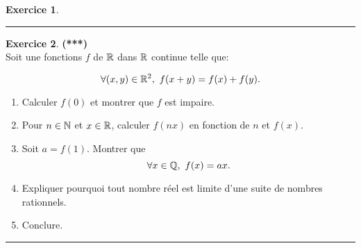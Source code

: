 \documentclass[a4paper,11pt]{article}
\theoremstyle{definition}
\newtheorem{exo}{Exercice} %
\begin{document}
\begin{minipage}{1\linewidth}
\begin{minipage}[t]{0.48\linewidth}
\begin{exo}
			\centering
			\rule{1\linewidth}{0.6pt}
		\end{exo}
	
		\begin{exo} \textbf{(***)}\quad\\[0.2cm]
			
			Soit une fonctions $f$ de $\mathbb{R}$ dans $\mathbb{R}$ continue telle que:
			
			
			$$\forall (x, y) \in \mathbb{R}^{2}, \ f(x+y) = f(x)+f(y).$$
			
			\begin{enumerate}
				\item Calculer $f (0)$ et montrer que $f$ est impaire.
				\item Pour $n \in \mathbb{N}$ et $x \in \mathbb{R}$, calculer $f (nx)$ en fonction de $n$ et $f (x)$.
				\item Soit $a = f (1)$. Montrer que $$ \forall x \in \Q,\ 
				f (x) = ax. $$
				
				\item Expliquer pourquoi tout nombre réel est limite d'une suite de nombres rationnels.
				\item Conclure.
			\end{enumerate}
			\centering
			\rule{1\linewidth}{0.6pt}
		\end{exo}
		
	
		
		
	\end{minipage}
\end{minipage}
\end{document}
